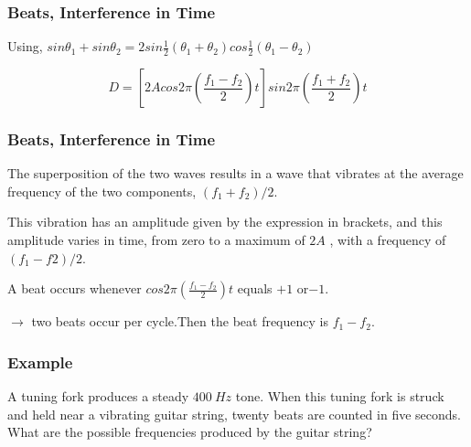 \documentclass[]{beamer}
\begin{document}

\begin{frame}
\frametitle{Beats, Interference in Time}




Using, $sin\theta_1+sin\theta_2=2sin\frac{1}{2}(\theta_1+\theta_2)cos\frac{1}{2}(\theta_1-\theta_2)$

\pause

\begin{equation}
D=\left[2Acos2\pi\left(\frac{f_1-f_2}{2}\right)t\right] sin2\pi\left(\frac{f_1+f_2}{2}\right)t
\end{equation}

  \end{frame}




\begin{frame}
\frametitle{Beats, Interference in Time}


 The superposition of the two waves results in a wave that vibrates at the average frequency of the two components, $(f_1+ f_ 2)/2$.

\pause
\vspace{3mm}

 This
vibration has an amplitude given by the expression in brackets, and this amplitude varies
in time, from zero to a maximum of $2A$ , with a
frequency of$ (f_1 - f 2)/2$. 

\pause
\vspace{3mm}

A beat occurs whenever $cos2\pi\left(\frac{f_1-f_2}{2}\right)t$ equals $+1$ or$ -1$. 
\vspace{3mm}

\pause
$ \rightarrow$ two beats occur per cycle.Then  the beat frequency is $f_1-f_2$.


  \end{frame}








\begin{frame}
\frametitle{Example}

A tuning fork produces a steady $400~Hz$ tone. When this
tuning fork is struck and held near a vibrating guitar string, twenty beats are counted
in five seconds. What are the possible frequencies produced by the guitar string?

  \end{frame}
\end{document}
